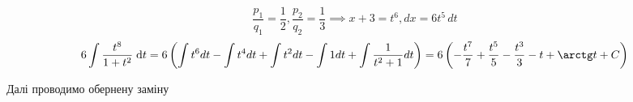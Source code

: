 \documentclass[../rgr1.tex]{subfiles}
\begin{document}
\Solution

\begin{equation}
	\frac{p_1}{q_1}=\frac{1}{2}, \frac{p_2}{q_2}=\frac{1}{3} \implies x+3 = t^6, dx = 6t^5\,dt
\end{equation}
\begin{dmath}
	6\int{\frac{t^8}{1+t^2}}{\;\mathrm{d}t}
	=6\left(
	\int t^6 dt
	-\int t^4 dt
	+\int t^2 dt
	-\int 1 dt
	+ \int \frac{1}{t^2+1} dt
	\right)
	=6\left(
	-\frac{t^7}{7}
	+\frac{t^5}{5}
	-\frac{t^3}{3}
	- t
	+ \arctg t + C
	\right)
\end{dmath}

Далі проводимо обернену заміну

\end{document}
